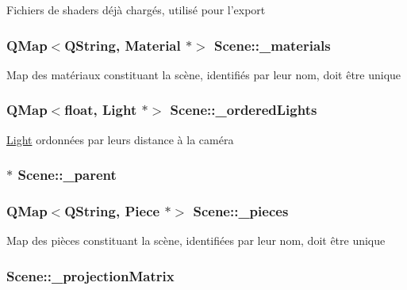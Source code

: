 Fichiers de shaders déjà chargés, utilisé pour l'export \hypertarget{class_scene_a5b96810fdeb47632d5ce6c2c47f41691}{
\subsubsection[{\+\_\+materials}]{\setlength{\rightskip}{0pt plus 5cm}Q\+Map$<$Q\+String, {\bf Material} $\ast$$>$ Scene\+::\+\_\+materials\hspace{0.3cm}{\ttfamily [private]}}}\label{class_scene_a5b96810fdeb47632d5ce6c2c47f41691}
Map des matériaux constituant la scène, identifiés par leur nom, doit être unique \hypertarget{class_scene_a5fae715ba6bdde7c382f9d779095a718}{
\subsubsection[{\+\_\+ordered\+Lights}]{\setlength{\rightskip}{0pt plus 5cm}Q\+Map$<$float, {\bf Light} $\ast$$>$ Scene\+::\+\_\+ordered\+Lights\hspace{0.3cm}{\ttfamily [private]}}}\label{class_scene_a5fae715ba6bdde7c382f9d779095a718}
\hyperlink{class_light}{Light} ordonnées par leurs distance à la caméra \hypertarget{class_scene_ae394dcdd910d007d32a6aa3869d693e6}{
\subsubsection[{\+\_\+parent}]{$\ast$ Scene\+::\+\_\+parent\hspace{0.3cm}{\ttfamily [private]}}}\label{class_scene_ae394dcdd910d007d32a6aa3869d693e6}
\hypertarget{class_scene_aa3a488d4be41fe6a187488e1e7a1035c}{
\subsubsection[{\+\_\+pieces}]{\setlength{\rightskip}{0pt plus 5cm}Q\+Map$<$Q\+String, {\bf Piece} $\ast$$>$ Scene\+::\+\_\+pieces\hspace{0.3cm}{\ttfamily [private]}}}\label{class_scene_aa3a488d4be41fe6a187488e1e7a1035c}
Map des pièces constituant la scène, identifiées par leur nom, doit être unique \hypertarget{class_scene_a7db3394191c0a07e6bdc456a53ac8ece}{
\subsubsection[{\+\_\+projection\+Matrix}]{ Scene\+::\+\_\+projection\+Matrix\hspace{0.3cm}{\ttfamily [private]}}}\label{class_scene_a7db3394191c0a07e6bdc456a53ac8ece}
